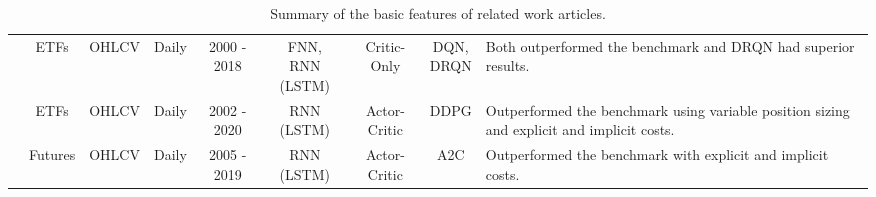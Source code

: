 \begin{sidewaystable}
\begin{tabularx}{\linewidth}{@{}ccccccccX@{}}
\cite{chen_application_2019} & ETFs & OHLCV & Daily & 2000 - 2018 & \makecell{FNN, \\ RNN (LSTM)} & Critic-Only & \makecell{DQN, \\  DRQN} & Both outperformed the benchmark and DRQN had superior results. \\

\cite{jia_lstm-ddpg_2021} & ETFs & OHLCV & Daily & 2002 - 2020 & RNN (LSTM) & Actor-Critic & DDPG & Outperformed the benchmark using variable position sizing and explicit and implicit costs. \\

\cite{zhang_deep_2020} & Futures & OHLCV & Daily & 2005 - 2019 & RNN (LSTM) & Actor-Critic & A2C & Outperformed the benchmark with explicit and implicit costs. \\
 
\bottomrule
\end{tabularx}
\caption{Summary of the basic features of related work articles.}
\label{Tables:BasicRelatedWork}
\end{sidewaystable}
